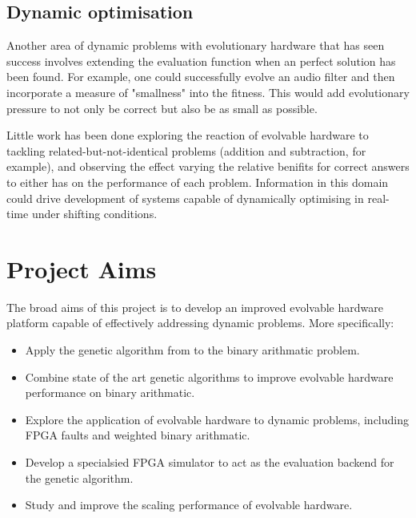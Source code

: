 \subsection{Dynamic optimisation}
Another area of dynamic problems with evolutionary hardware that has seen success involves
extending the evaluation function when an perfect solution has been found. For example,
one could successfully evolve an audio filter and then incorporate a measure of "smallness"
into the fitness. This would add evolutionary pressure to not only be correct but also
be as small as possible.

Little work has been done exploring the reaction of evolvable hardware to tackling
related-but-not-identical problems (addition and subtraction, for example), and observing
the effect varying
the relative benifits for correct answers to either has on the performance of each problem.
Information in this domain could
drive development of systems capable of dynamically optimising in real-time
under shifting conditions.

\section{Project Aims}

The broad aims of this project is to develop an improved evolvable hardware
platform capable of effectively addressing dynamic problems. More specifically:
\begin{itemize}
	\item Apply the genetic algorithm from \cite{10.1007/3-540-63173-9_61} to
		the binary arithmatic problem.
	\item Combine state of the art genetic algorithms to improve
		evolvable hardware performance on binary arithmatic.
	\item Explore the application of evolvable hardware to dynamic
		problems, including FPGA faults and weighted binary arithmatic.
	\item Develop a specialsied FPGA simulator to act as the evaluation
		backend for the genetic algorithm.
	\item Study and improve the scaling performance of evolvable hardware.
\end{itemize}

